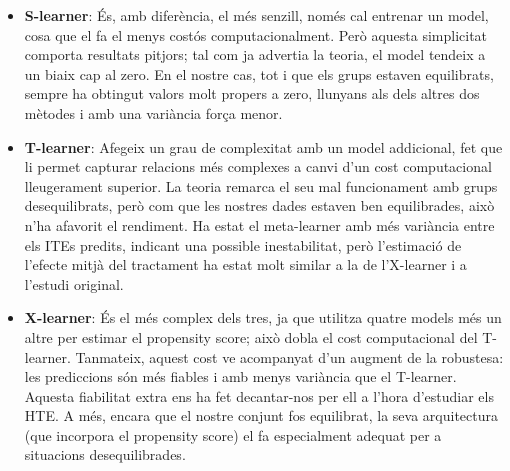 \documentclass[../main.tex]{subfiles}
\begin{document}
\begin{itemize}
    \item \textbf{S-learner}: És, amb diferència, el més senzill, només cal entrenar un model, cosa que el fa el menys costós computacionalment. Però aquesta simplicitat comporta resultats pitjors; tal com ja advertia la teoria, el model tendeix a un biaix cap al zero. En el nostre cas, tot i que els grups estaven equilibrats, sempre ha obtingut valors molt propers a zero, llunyans als dels altres dos mètodes i amb una variància força menor.
    \item \textbf{T-learner}: Afegeix un grau de complexitat amb un model addicional, fet que li permet capturar relacions més complexes a canvi d’un cost computacional lleugerament superior. La teoria remarca el seu mal funcionament amb grups desequilibrats, però com que les nostres dades estaven ben equilibrades, això n’ha afavorit el rendiment. Ha estat el meta-learner amb més variància entre els ITEs predits, indicant una possible inestabilitat, però l’estimació de l’efecte mitjà del tractament ha estat molt similar a la de l’X-learner i a l’estudi original.
    \item \textbf{X-learner}: És el més complex dels tres, ja que utilitza quatre models més un altre per estimar el propensity score; això dobla el cost computacional del T-learner. Tanmateix, aquest cost ve acompanyat d’un augment de la robustesa: les prediccions són més fiables i amb menys variància que el T-learner. Aquesta fiabilitat extra ens ha fet decantar-nos per ell a l’hora d’estudiar els HTE. A més, encara que el nostre conjunt fos equilibrat, la seva arquitectura (que incorpora el propensity score) el fa especialment adequat per a situacions desequilibrades.
\end{itemize}
\end{document}
